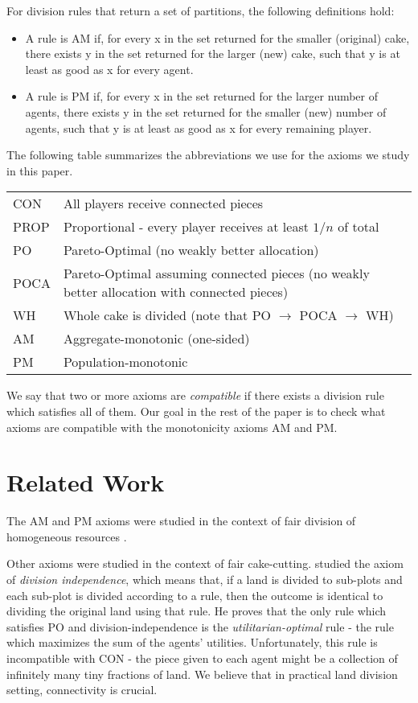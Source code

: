 \documentclass[a4paper,12pt]{article}
\begin{document}
For division rules that return a set of partitions, the following definitions hold:
\begin{itemize}
\item{A rule is AM if, for every x in the set returned for the smaller (original) cake, there exists y in the set returned for the larger (new) cake,
such that y is at least as good as x for every agent.}
\item{A rule is PM if, for every x in the set returned for the larger number of agents, there exists y in the set returned for the smaller (new) number of agents, such that y is at least as good as x for every remaining player.}
\end{itemize}

The following table summarizes the abbreviations we use for the axioms we study in this paper.

\begin{table}
    \begin{tabular}{|l|l|}
        CON  & All players receive connected pieces \\
        PROP & Proportional - every player receives at least $1/n$ of total  \\
        PO   & Pareto-Optimal (no weakly better allocation) \\
        POCA & Pareto-Optimal assuming connected pieces (no weakly better allocation with connected pieces)  \\
        WH   & Whole cake is divided (note that PO $\to$ POCA $\to$ WH) \\
        AM   & Aggregate-monotonic  (one-sided) \\
        PM   & Population-monotonic \\
    \end{tabular}
\end{table}

We say that two or more axioms are \emph{compatible} if there exists a division rule which satisfies all of them. Our goal in the rest of the paper is to check what axioms are compatible with the monotonicity axioms AM and PM.


\section{Related Work}
The AM and PM axioms were studied in the context of fair division of homogeneous resources \cite{Moulin_1988} \cite{Moulin_1990} \cite{Thomson_1994} \cite{Thomson_2011}.

Other axioms were studied in the context of fair cake-cutting. \cite{Chambers_2005} studied the axiom of \emph{division independence}, which means that, if a land is divided to sub-plots and each sub-plot is divided according to a rule, then the outcome is identical to dividing the original land using that rule. He proves that the only rule which satisfies PO and division-independence is the \emph{utilitarian-optimal} rule - the rule which maximizes the sum of the agents' utilities. Unfortunately, this rule is incompatible with CON - the piece given to each agent might be a collection of infinitely many tiny fractions of land. We believe that in practical land division setting, connectivity is crucial.
\end{document}
